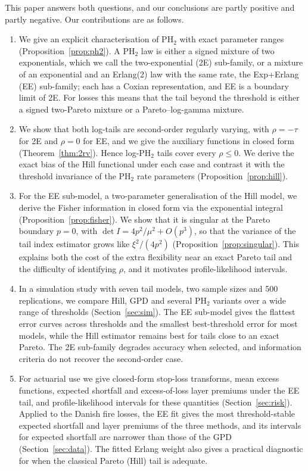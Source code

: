 \documentclass[12pt]{article}
\theoremstyle{definition}
\theoremstyle{remark}
\begin{document}
This paper answers both questions, and our conclusions are partly positive and partly negative. Our contributions are as follows.
\begin{enumerate}
\item We give an explicit characterisation of PH$_2$ with exact parameter ranges (Proposition~\ref{prop:ph2}). A PH$_2$ law is either a signed mixture of two exponentials, which we call the two-exponential (2E) sub-family, or a mixture of an exponential and an Erlang(2) law with the same rate, the Exp+Erlang (EE) sub-family; each has a Coxian representation, and EE is a boundary limit of 2E. For losses this means that the tail beyond the threshold is either a signed two-Pareto mixture or a Pareto--log-gamma mixture.
\item We show that both log-tails are second-order regularly varying, with $\rho=-\tau$ for 2E and $\rho=0$ for EE, and we give the auxiliary functions in closed form (Theorem~\ref{thm:2rv}). Hence log-PH$_2$ tails cover every $\rho\le 0$. We derive the exact bias of the Hill functional under each case and contrast it with the threshold invariance of the PH$_2$ rate parameters (Proposition~\ref{prop:hill}).
\item For the EE sub-model, a two-parameter generalisation of the Hill model, we derive the Fisher information in closed form via the exponential integral (Proposition~\ref{prop:fisher}). We show that it is singular at the Pareto boundary $p=0$, with $\det I=4p^2/\mu^2+O(p^3)$, so that the variance of the tail index estimator grows like $\xi^2/(4p^2)$ (Proposition~\ref{prop:singular}). This explains both the cost of the extra flexibility near an exact Pareto tail and the difficulty of identifying $\rho$, and it motivates profile-likelihood intervals.
\item In a simulation study with seven tail models, two sample sizes and 500 replications, we compare Hill, GPD and several PH$_2$ variants over a wide range of thresholds (Section~\ref{sec:sim}). The EE sub-model gives the flattest error curves across thresholds and the smallest best-threshold error for most models, while the Hill estimator remains best for tails close to an exact Pareto. The 2E sub-family degrades accuracy when selected, and information criteria do not recover the second-order case.
\item For actuarial use we give closed-form stop-loss transforms, mean excess functions, expected shortfall and excess-of-loss layer premiums under the EE tail, and profile-likelihood intervals for these quantities (Section~\ref{sec:risk}). Applied to the Danish fire losses, the EE fit gives the most threshold-stable expected shortfall and layer premiums of the three methods, and its intervals for expected shortfall are narrower than those of the GPD (Section~\ref{sec:data}). The fitted Erlang weight also gives a practical diagnostic for when the classical Pareto (Hill) tail is adequate.
\end{enumerate}
\end{document}
